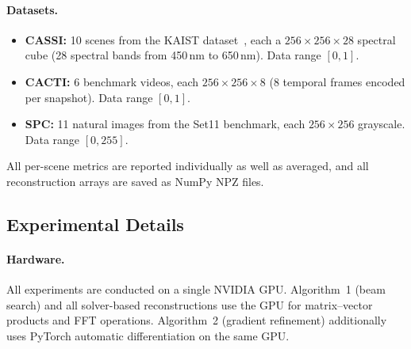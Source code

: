 \paragraph{Datasets.}
\begin{itemize}
  \item \textbf{CASSI:} 10 scenes from the KAIST dataset~\cite{choi2017kaist},
    each a $256 \times 256 \times 28$ spectral cube (28 spectral bands
    from 450\,nm to 650\,nm).  Data range $[0, 1]$.
  \item \textbf{CACTI:} 6 benchmark videos, each $256 \times 256 \times 8$
    (8 temporal frames encoded per snapshot).  Data range $[0, 1]$.
  \item \textbf{SPC:} 11 natural images from the Set11 benchmark, each
    $256 \times 256$ grayscale.  Data range $[0, 255]$.
\end{itemize}

\noindent All per-scene metrics are reported individually as well as
averaged, and all reconstruction arrays are saved as NumPy NPZ files.


\subsection*{Experimental Details}
\label{sec:methods:experimental}

\paragraph{Hardware.}
All experiments are conducted on a single NVIDIA GPU.  Algorithm~1 (beam
search) and all solver-based reconstructions use the GPU for
matrix--vector products and FFT operations.  Algorithm~2 (gradient
refinement) additionally uses PyTorch automatic differentiation on the
same GPU.

